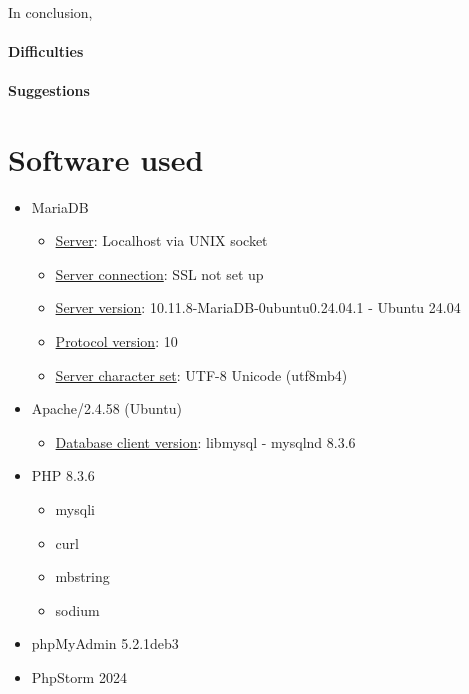 \documentclass[11pt,a4paper,titlepage]{article}
\begin{document}
\paragraph{}
In conclusion, 

\paragraph{Difficulties}

\paragraph{Suggestions}

\newpage
\appendix
\section{Software used}

\begin{itemize}
	\item MariaDB 
	\begin{itemize}
		\item \underline{Server}: Localhost via UNIX socket
		\item \underline{Server connection}: SSL not set up
		\item \underline{Server version}: 10.11.8-MariaDB-0ubuntu0.24.04.1 - Ubuntu 24.04
		\item \underline{Protocol version}: 10
		\item \underline{Server character set}: UTF-8 Unicode (utf8mb4)
	\end{itemize}
	\item Apache/2.4.58 (Ubuntu)
	\begin{itemize}
		\item \underline{Database client version}: libmysql - mysqlnd 8.3.6
	\end{itemize}
	\item PHP 8.3.6 \cite{php} 
	\begin{itemize}
		\item mysqli
		\item curl
		\item mbstring
		\item sodium
	\end{itemize}
	\item phpMyAdmin 5.2.1deb3
	\item PhpStorm 2024 \cite{phpstorm}
\end{itemize}
\end{document}
